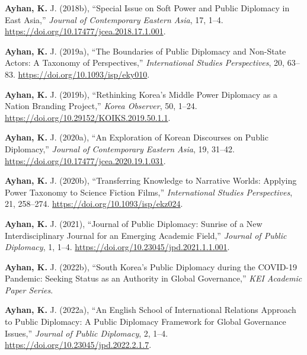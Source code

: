 \documentclass[11pt,a4paper,]{awesome-cv}
\begin{document}
\leavevmode{}%
\textbf{Ayhan, K.} J. (2018b), {``Special {Issue} on {Soft} {Power} and
{Public} {Diplomacy} in {East} {Asia},''} \emph{Journal of Contemporary
Eastern Asia}, 17, 1--4.
\url{https://doi.org/10.17477/jcea.2018.17.1.001}.

\leavevmode{}%
\textbf{Ayhan, K.} J. (2019a), {``The {Boundaries} of {Public}
{Diplomacy} and {Non}-{State} {Actors}: {A} {Taxonomy} of
{Perspectives},''} \emph{International Studies Perspectives}, 20,
63--83. \url{https://doi.org/10.1093/isp/eky010}.

\leavevmode{}%
\textbf{Ayhan, K.} J. (2019b), {``Rethinking {Korea}'s {Middle} {Power}
{Diplomacy} as a {Nation} {Branding} {Project},''} \emph{Korea
Observer}, 50, 1--24. \url{https://doi.org/10.29152/KOIKS.2019.50.1.1}.

\leavevmode{}%
\textbf{Ayhan, K.} J. (2020a), {``An {Exploration} of {Korean}
{Discourses} on {Public} {Diplomacy},''} \emph{Journal of Contemporary
Eastern Asia}, 19, 31--42.
\url{https://doi.org/10.17477/jcea.2020.19.1.031}.

\leavevmode{}%
\textbf{Ayhan, K.} J. (2020b), {``Transferring {Knowledge} to
{Narrative} {Worlds}: {Applying} {Power} {Taxonomy} to {Science}
{Fiction} {Films},''} \emph{International Studies Perspectives}, 21,
258--274. \url{https://doi.org/10.1093/isp/ekz024}.

\leavevmode{}%
\textbf{Ayhan, K.} J. (2021), {``Journal of {Public} {Diplomacy}:
{Sunrise} of a {New} {Interdisciplinary} {Journal} for an {Emerging}
{Academic} {Field},''} \emph{Journal of Public Diplomacy}, 1, 1--4.
\url{https://doi.org/10.23045/jpd.2021.1.1.001}.

\leavevmode{}%
\textbf{Ayhan, K.} J. (2022b), {``South {Korea}'s {Public} {Diplomacy}
during the {COVID}-19 {Pandemic}: {Seeking} {Status} as an {Authority}
in {Global} {Governance},''} \emph{KEI Academic Paper Series}.

\leavevmode{}%
\textbf{Ayhan, K.} J. (2022a), {``An {English} {School} of
{International} {Relations} {Approach} to {Public} {Diplomacy}: {A}
{Public} {Diplomacy} {Framework} for {Global} {Governance} {Issues},''}
\emph{Journal of Public Diplomacy}, 2, 1--4.
\url{https://doi.org/10.23045/jpd.2022.2.1.7}.
\end{document}

